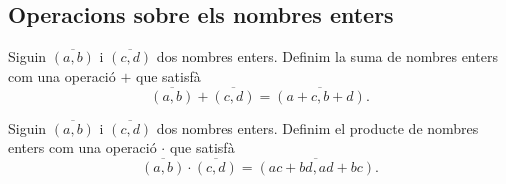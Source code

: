 \documentclass[../../Main.tex]{subfiles}
\begin{document}
	\subsection{Operacions sobre els nombres enters} %
	\begin{definition}
		\label{def:suma de nombres enters}
		Siguin \(\overline{(a,b)}\) i \(\overline{(c,d)}\) dos nombres enters. Definim la suma de nombres enters com una operació \(+\) que satisfà
		\[\overline{(a,b)}+\overline{(c,d)}=\overline{(a+c,b+d)}.\]
	\end{definition}
	\begin{definition}
		\label{def:producte de nombres enters}
		Siguin \(\overline{(a,b)}\) i \(\overline{(c,d)}\) dos nombres enters. Definim el producte de nombres enters com una operació \(\cdot\) que satisfà
		\[\overline{(a,b)}\cdot\overline{(c,d)}=\overline{(ac+bd,ad+bc)}.\]
	\end{definition}
\end{document}
